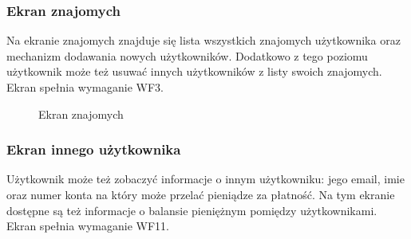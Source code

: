 \clearpage
\subsubsection{Ekran znajomych}
Na ekranie znajomych znajduje się lista wszystkich znajomych użytkownika oraz mechanizm dodawania nowych użytkowników. Dodatkowo z tego poziomu użytkownik może też usuwać innych użytkowników z listy swoich znajomych. Ekran spełnia wymaganie WF3.

\begin{figure}[h!]%
    \centering
    \qquad
    \caption{Ekran znajomych}%
\end{figure}

\clearpage
\subsubsection{Ekran innego użytkownika}
Użytkownik może też zobaczyć informacje o innym użytkowniku: jego email, imie oraz numer konta na który może przelać pieniądze za płatność. Na tym ekranie dostępne są też informacje o balansie pieniężnym pomiędzy użytkownikami. Ekran spełnia wymaganie WF11.

\begin{figure}[h!]%
    \centering
\end{figure}
